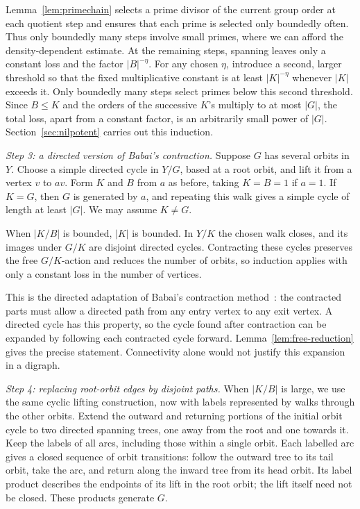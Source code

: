\documentclass[11pt,a4paper,reqno]{amsart}
\theoremstyle{definition}
\theoremstyle{remark}
\numberwithin{equation}{section}
\begin{document}
Lemma~\ref{lem:primechain} selects a prime divisor of the current group order at each quotient step and ensures that each prime is selected only boundedly often. Thus only boundedly many steps involve small primes, where we can afford the density-dependent estimate. At the remaining steps, spanning leaves only a constant loss and the factor $|B|^{-\eta}$. For any chosen $\eta$, introduce a second, larger threshold so that the fixed multiplicative constant is at least $|K|^{-\eta}$ whenever $|K|$ exceeds it. Only boundedly many steps select primes below this second threshold. Since $B\le K$ and the orders of the successive $K$'s multiply to at most $|G|$, the total loss, apart from a constant factor, is an arbitrarily small power of $|G|$. Section~\ref{sec:nilpotent} carries out this induction.

\smallskip
\noindent\emph{Step 3: a directed version of Babai's contraction.}
Suppose $G$ has several orbits in $Y$. Choose a simple directed cycle in $Y/G$, based at a root orbit, and lift it from a vertex $v$ to $av$. Form $K$ and $B$ from $a$ as before, taking $K=B=1$ if $a=1$. If $K=G$, then $G$ is generated by $a$, and repeating this walk gives a simple cycle of length at least $|G|$. We may assume $K\ne G$.

When $|K/B|$ is bounded, $|K|$ is bounded. In $Y/K$ the chosen walk closes, and its images under $G/K$ are disjoint directed cycles. Contracting these cycles preserves the free $G/K$-action and reduces the number of orbits, so induction applies with only a constant loss in the number of vertices.

This is the directed adaptation of Babai's contraction method~\cite{BabaiContractions}: the contracted parts must allow a directed path from any entry vertex to any exit vertex. A directed cycle has this property, so the cycle found after contraction can be expanded by following each contracted cycle forward. Lemma~\ref{lem:free-reduction} gives the precise statement. Connectivity alone would not justify this expansion in a digraph.

\smallskip
\noindent\emph{Step 4: replacing root-orbit edges by disjoint paths.}
When $|K/B|$ is large, we use the same cyclic lifting construction, now with labels represented by walks through the other orbits. Extend the outward and returning portions of the initial orbit cycle to two directed spanning trees, one away from the root and one towards it. Keep the labels of all arcs, including those within a single orbit. Each labelled arc gives a closed sequence of orbit transitions: follow the outward tree to its tail orbit, take the arc, and return along the inward tree from its head orbit. Its label product describes the endpoints of its lift in the root orbit; the lift itself need not be closed. These products generate $G$.
\end{document}
